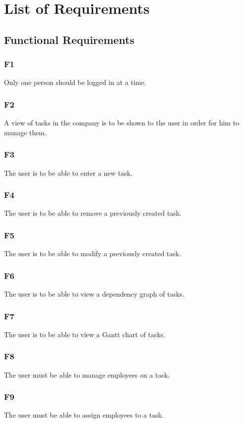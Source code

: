 \documentclass[12pt]{article}
\begin{document}
\section{List of Requirements}

\subsection{Functional Requirements}
\subsubsection{F1}
{
 Only one person should be logged in at a time.
}
\subsubsection{F2}
{
A view of tasks in the company is to be shown to the user in order for him to manage them.
}
\subsubsection{F3}
{
The user is to be able to enter a new task.
}
\subsubsection{F4}
{
The user is to be able to remove a previously created task.
}
\subsubsection{F5}
{
The user is to be able to modify a previously created task.
}
\subsubsection{F6}
{
The user is to be able to view a dependency graph of tasks.
}
\subsubsection{F7}
{
The user is to be able to view a Gantt chart of tasks.
}
\subsubsection{F8}
{
The user must be able to manage employees on a task.
}
\subsubsection{F9}
{
The user must be able to assign employees to a task.
}
\end{document}
